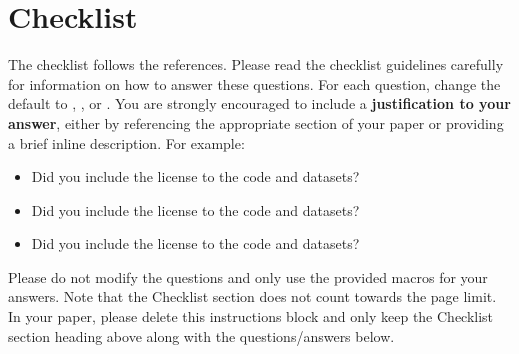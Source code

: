 \documentclass{article}
\begin{document}




\section*{Checklist}


The checklist follows the references.  Please
read the checklist guidelines carefully for information on how to answer these
questions.  For each question, change the default \answerTODO{} to \answerYes{},
\answerNo{}, or \answerNA{}.  You are strongly encouraged to include a {\bf
justification to your answer}, either by referencing the appropriate section of
your paper or providing a brief inline description.  For example:
\begin{itemize}
  \item Did you include the license to the code and datasets? 
  \item Did you include the license to the code and datasets? 
  \item Did you include the license to the code and datasets? \answerNA{}
\end{itemize}
Please do not modify the questions and only use the provided macros for your
answers.  Note that the Checklist section does not count towards the page
limit.  In your paper, please delete this instructions block and only keep the
Checklist section heading above along with the questions/answers below.
\end{document}
